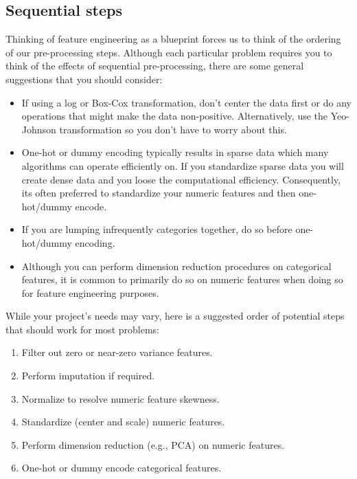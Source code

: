 \documentclass[]{krantz}
\providecommand{\tightlist}{%
  \setlength{\itemsep}{0pt}\setlength{\parskip}{0pt}}
\begin{document}
\hypertarget{sequential-steps}{%
\subsection{Sequential steps}\label{sequential-steps}}

Thinking of feature engineering as a blueprint forces us to think of the ordering of our pre-processing steps. Although each particular problem requires you to think of the effects of sequential pre-processing, there are some general suggestions that you should consider:

\begin{itemize}
\tightlist
\item
  If using a log or Box-Cox transformation, don't center the data first or do any operations that might make the data non-positive. Alternatively, use the Yeo-Johnson transformation so you don't have to worry about this.
\item
  One-hot or dummy encoding typically results in sparse data which many algorithms can operate efficiently on. If you standardize sparse data you will create dense data and you loose the computational efficiency. Consequently, its often preferred to standardize your numeric features and then one-hot/dummy encode.
\item
  If you are lumping infrequently categories together, do so before one-hot/dummy encoding.
\item
  Although you can perform dimension reduction procedures on categorical features, it is common to primarily do so on numeric features when doing so for feature engineering purposes.
\end{itemize}

While your project's needs may vary, here is a suggested order of potential steps that should work for most problems:

\begin{enumerate}
\def\labelenumi{\arabic{enumi}.}
\tightlist
\item
  Filter out zero or near-zero variance features.
\item
  Perform imputation if required.
\item
  Normalize to resolve numeric feature skewness.
\item
  Standardize (center and scale) numeric features.
\item
  Perform dimension reduction (e.g., PCA) on numeric features.
\item
  One-hot or dummy encode categorical features.
\end{enumerate}
\end{document}
